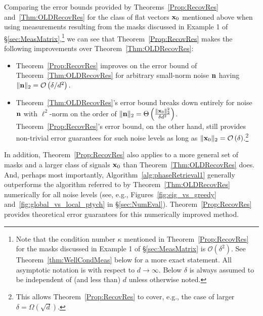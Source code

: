 Comparing the error bounds provided by Theorems~\ref{Prop:RecovRes} and~\ref{Thm:OLDRecovRes} for the class of flat vectors $\mathbf x_0$ mentioned above when using measurements resulting from the masks discussed in Example 1 of \S\ref{sec:MeasMatrix},\footnote{Note that the condition number $\kappa$ mentioned in Theorem~\ref{Prop:RecovRes} for the masks discussed in Example 1 of \S\ref{sec:MeasMatrix} is $\mathcal{O}(\delta^2)$.  See Theorem~\ref{thm:WellCondMeas} below for a more exact statement.  All asymptotic notation is with respect to $d \rightarrow \infty$.  Below $\delta$ is always assumed to be independent of (and less than) $d$ unless otherwise noted.} we can see that  Theorem~\ref{Prop:RecovRes} makes the following improvements over Theorem~\ref{Thm:OLDRecovRes}:
\begin{itemize}
\item Theorem~\ref{Prop:RecovRes} improves on the error bound of Theorem~\ref{Thm:OLDRecovRes} for arbitrary small-norm noise $\mathbf n$ having $\| \mathbf n \|_2 = \mathcal{O} \left( \delta / d^2 \right).$
\item Theorem~\ref{Thm:OLDRecovRes}'s error bound breaks down entirely for noise $\mathbf n$ with $\ell^2$-norm on the order of $\| \mathbf n \|_2 = \Theta \left( \frac{\| \mathbf x_0 \|^2_2}{\delta d^2} \right)$.   Theorem~\ref{Prop:RecovRes}'s error bound, on the other hand, still provides non-trivial error guarantees for such noise levels as long as $\| \mathbf x_0 \|_2 = \mathcal{O}\left( \delta \right)$.\footnote{This allows Theorem~\ref{Prop:RecovRes} to cover, e.g., the case of larger $\delta = \Omega \left( \sqrt{d} \right)$.}
\end{itemize}
In addition, Theorem~\ref{Prop:RecovRes} also applies to a more general set of masks and a larger class of signals $\mathbf x_0$ than Theorem~\ref{Thm:OLDRecovRes} does.  And, perhaps most importantly, Algorithm~\ref{alg:phaseRetrieval1} generally outperforms the algorithm referred to by Theorem~\ref{Thm:OLDRecovRes} numerically for all noise levels (see, e.g., Figures~\ref{fig:eig_vs_greedy} and~\ref{fig:global_vs_local_ptych} in \S\ref{sec:NumEval}).  Theorem~\ref{Prop:RecovRes} provides theoretical error guarantees for this numerically improved method.

